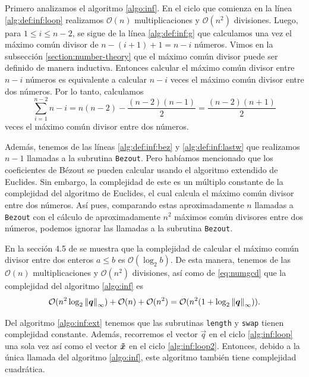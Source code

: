 Primero analizamos el algoritmo \ref{algo:inf}. En el ciclo que comienza en la línea
\ref{alg:def:inf:loop} realizamos $\mathcal{O}(n)$ multiplicaciones y $\mathcal{O}(n^2)$ divisiones.
Luego, para $1 \leq i \leq n - 2$, se sigue de la línea \ref{alg:def:inf:g} que calculamos una vez
el máximo común divisor de $n - (i + 1) + 1 = n - i$ números. Vimos en la subsección
\ref{section:number-theory} que el máximo común divisor puede ser definido de manera inductiva.
Entonces calcular el máximo común divisor entre $n - i$ números es equivalente a calcular $n - i$
veces el máximo común divisor entre dos números. Por lo tanto, calculamos
\begin{equation}
	\label{eq:numgcd}
	\sum_{i=1}^{n-2}n - i = n(n - 2) - \frac{(n-2)(n-1)}{2} = \frac{(n-2)(n+1)}{2}
\end{equation}
veces el máximo común divisor entre dos números.

Además, tenemos de las líneas \ref{alg:def:inf:bez} y \ref{alg:def:inf:lastw} que realizamos $n - 1$
llamadas a la subrutina \texttt{Bezout}. Pero habíamos mencionado que los coeficientes de Bézout se
pueden calcular usando el algoritmo extendido de Euclides. Sin embargo, la complejidad de este es un
múltiplo constante de la complejidad del algoritmo de Euclides, el cual calcula el máximo común
divisor entre dos números. Así pues, comparando estas aproximadamente $n$ llamadas a \texttt{Bezout}
con el cálculo de aproximadamente $n^2$ máximos común divisores entre dos números, podemos ignorar las
llamadas a la subrutina \texttt{Bezout}.

En la sección 4.5 de \cite{knuth} se muestra que la complejidad de calcular el máximo común divisor
entre dos enteros $a \leq b$ es $\mathcal{O}(\log_2 b)$. De esta manera, tenemos de las
$\mathcal{O}(n)$ multiplicaciones y $\mathcal{O}(n^2)$ divisiones, así como de \eqref{eq:numgcd} que
la complejidad del algoritmo \ref{algo:inf} es
\begin{equation*}
	\mathcal{O}(n^2\log_2\left\lVert \boldsymbol{q} \right\rVert_\infty) + \mathcal{O}(n) + \mathcal{O}(n^2) =
	\mathcal{O}(n^2(1 + \log_2\left\lVert \boldsymbol{q} \right\rVert_\infty)).
\end{equation*}

Del algoritmo \ref{algo:inf:ext} tenemos que las subrutinas \texttt{length} y
\texttt{swap} tienen complejidad constante. Además, recorremos el vector $\vec{q}$ en el ciclo
\ref{alg:inf:loop} una sola vez así como el vector $\boldsymbol{\tilde{x}}$ en el ciclo \ref{alg:inf:loop2}.
Entonces, debido a la única llamada del algoritmo \ref{algo:inf}, este algoritmo también tiene
complejidad cuadrática.


